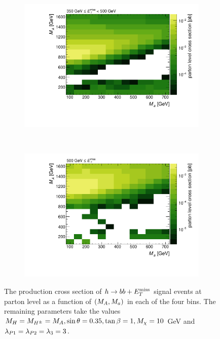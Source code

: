 \begin{figure}[tbp]
\begin{subfigure}{0.48\textwidth}
\includegraphics[width = \textwidth]{texinputs/04_grid/figures/monoHbb_parton_level_cross_section_bin_3_ma_vs_mA_lin.pdf}
\end{subfigure}
~
\begin{subfigure}{0.48\textwidth}
\includegraphics[width = \textwidth]{texinputs/04_grid/figures/monoHbb_parton_level_cross_section_bin_4_ma_vs_mA_lin.pdf}
\end{subfigure}
\caption[$h\to bb + \MET$ cross section binned in $\MET$, $\mA$ - $\ma$ plane ]
{
The production cross section of $h\to bb + \MET$ signal events at parton level as a function of $(M_{A},M_{a})$ in each of the four \met bins. 
The remaining parameters take the values
$ M_{H}=M_{H^{\pm}}= M_{A}, \sin\theta = 0.35, \tan\beta = 1, M_{\chi} = 10$ GeV and $ \lambda_{P1} = \lambda_{P2} = \lambda_{3} = 3 $.
}
\label{fig:monoHbb_xsec_bins_mA_ma}
\end{figure}

